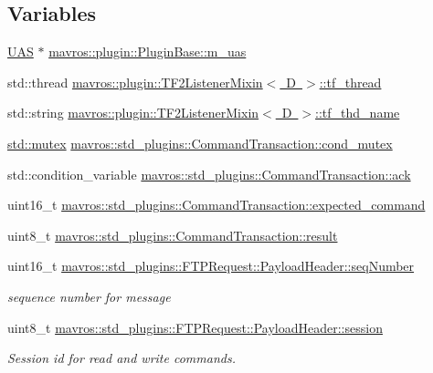 \subsection*{Variables}
\begin{DoxyCompactItemize}
\item 
\mbox{\hyperlink{classmavros_1_1UAS}{U\+AS}} $\ast$ \mbox{\hyperlink{group__plugin_ga198ba0390b8d70025bfb7f9467ae3057}{mavros\+::plugin\+::\+Plugin\+Base\+::m\+\_\+uas}}
\item 
std\+::thread \mbox{\hyperlink{group__plugin_ga5ac5c640e09c36aefab3741e96bcd3ab}{mavros\+::plugin\+::\+T\+F2\+Listener\+Mixin$<$ D $>$\+::tf\+\_\+thread}}
\item 
std\+::string \mbox{\hyperlink{group__plugin_gaff209548a5d3a38bdbf724ba30f9bcbb}{mavros\+::plugin\+::\+T\+F2\+Listener\+Mixin$<$ D $>$\+::tf\+\_\+thd\+\_\+name}}
\item 
\mbox{\hyperlink{data_8c_a4acff8232e4aec9cd5c6dc200ac55ef3}{std\+::mutex}} \mbox{\hyperlink{group__plugin_gaf3f74e20bdc98d39e8aedab007212e66}{mavros\+::std\+\_\+plugins\+::\+Command\+Transaction\+::cond\+\_\+mutex}}
\item 
std\+::condition\+\_\+variable \mbox{\hyperlink{group__plugin_gadb97fd9fc709112a544a52a24ecde527}{mavros\+::std\+\_\+plugins\+::\+Command\+Transaction\+::ack}}
\item 
uint16\+\_\+t \mbox{\hyperlink{group__plugin_gac9fd4b59474130b5bbc429fbbb5b6298}{mavros\+::std\+\_\+plugins\+::\+Command\+Transaction\+::expected\+\_\+command}}
\item 
uint8\+\_\+t \mbox{\hyperlink{group__plugin_ga2a8b012d390601f0b01d311c3c733d7a}{mavros\+::std\+\_\+plugins\+::\+Command\+Transaction\+::result}}
\item 
uint16\+\_\+t \mbox{\hyperlink{group__plugin_ga0bde534b62af463e4deeba5c0810dc9f}{mavros\+::std\+\_\+plugins\+::\+F\+T\+P\+Request\+::\+Payload\+Header\+::seq\+Number}}
\begin{DoxyCompactList}\small\item\em sequence number for message \end{DoxyCompactList}\item 
uint8\+\_\+t \mbox{\hyperlink{group__plugin_ga1209ac70809aacaac73c8213101abee0}{mavros\+::std\+\_\+plugins\+::\+F\+T\+P\+Request\+::\+Payload\+Header\+::session}}
\begin{DoxyCompactList}\small\item\em Session id for read and write commands. \end{DoxyCompactList}\item 

\end{DoxyCompactItemize}
